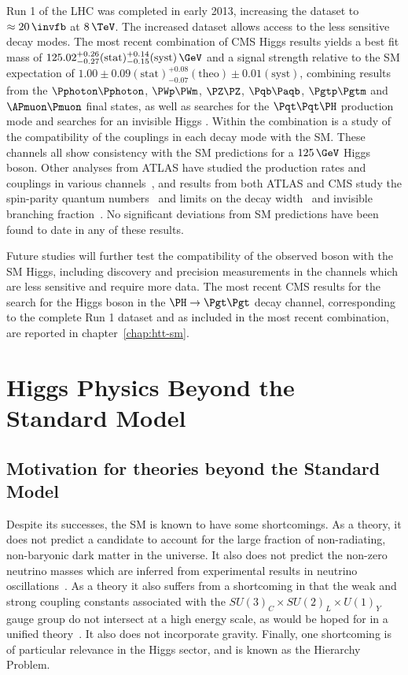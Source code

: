 Run 1 of the LHC was completed in early 2013, increasing the dataset to
$\approx20\,\invfb$ at $8\,\TeV$. The increased dataset allows access to the less
sensitive decay modes. The most recent combination of CMS Higgs results yields a
best fit mass of
$125.02^{+0.26}_{-0.27}(\text{stat})^{+0.14}_{-0.15}(\text{syst})\,\GeV$ and a
signal strength relative to the \ac{SM} expectation of
$1.00\pm0.09(\text{stat})^{+0.08}_{-0.07}(\text{theo})\pm0.01(\text{syst})$,
combining results from the $\Pphoton\Pphoton$, $\PWp\PWm$, $\PZ\PZ$,
$\Pqb\Paqb$, $\Pgtp\Pgtm$ and $\APmuon\Pmuon$ final states, as well as 
searches for the $\Pqt\Pqt\PH$ production mode and searches for an invisible
Higgs \cite{CMScomb}. Within the combination is a study of the compatibility of
the couplings in each decay mode with the \ac{SM}. 
These channels all show consistency with the \ac{SM}
predictions for a $125\,\GeV$ Higgs boson. Other analyses from ATLAS have
studied the production rates and couplings in various channels~\cite{Aad:2014eva,Aad:2014lwa,Aad:2015vsa}, 
and results from both ATLAS and CMS study the spin-parity quantum
numbers~\cite{Chatrchyan:2013mxa,Chatrchyan:2013iaa,Aad:2013xqa} and limits on
the decay width~\cite{Khachatryan:2014iha} and invisible branching
fraction~\cite{Aad:2014iia,Chatrchyan:2014tja}. No significant deviations from \ac{SM}
predictions have been found to date in any of these results.

Future studies will further test the compatibility of the observed boson with
the \ac{SM} Higgs, including discovery and precision measurements in the
channels which are less sensitive and require more data. 
The most recent CMS results for the search for the Higgs boson in the $\HToTauTau$
decay channel, corresponding to the complete Run 1 dataset and as included in
the most recent combination, are reported in chapter~\ref{chap:htt-sm}.

\section{Higgs Physics Beyond the Standard Model}
\label{sec:BSM}

\subsection{Motivation for theories beyond the Standard Model}
\label{sec:hierarchyproblem}

Despite its successes, the \ac{SM} is known to have some shortcomings. As a
theory, it does not predict a candidate to account for the large fraction of
non-radiating, non-baryonic dark matter in the universe. It also does not
predict the non-zero neutrino masses which are inferred from experimental
results in neutrino oscillations~\cite{PDG}. As a theory it also suffers from a
shortcoming in that the weak and strong coupling constants associated with the
$SU(3)_{C} \times SU(2)_{L} \times U(1)_{Y}$ gauge group do not intersect at a
high energy scale, as would be hoped for in a unified theory~\cite{Amaldi:1991cn}. It also does not
incorporate gravity. Finally, one shortcoming is of particular relevance 
in the Higgs sector, and is known as the Hierarchy Problem.

